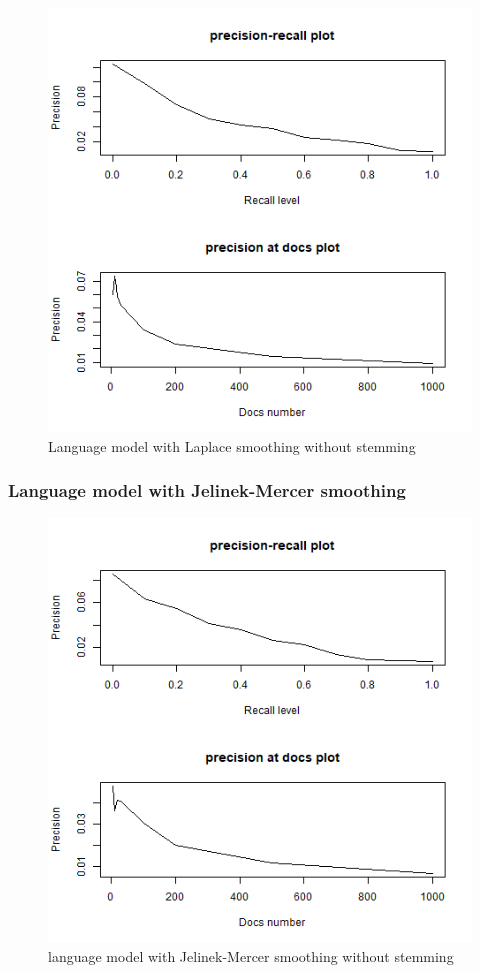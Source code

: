 \documentclass[a4pper,11pt,onecolumn]{article}
\begin{document}
    \begin{figure}[H]
    \caption{Language model with Laplace smoothing without stemming}
    \includegraphics[scale = 0.6]{model4.png}
    \centering
    \end{figure}

\subsubsection{Language model with Jelinek-Mercer smoothing}

    \begin{figure}[H]
    \caption{language model with Jelinek-Mercer smoothing without stemming}
    \includegraphics[scale = 0.6]{model6.png}
    \centering
    \end{figure}
\end{document}
